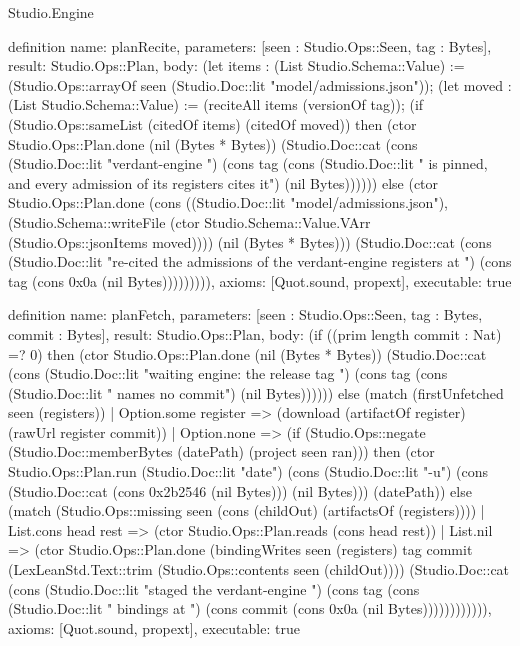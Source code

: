 \begin{lexlean}{Studio.Engine}
\begin{semanticmodule}
definition{
  name: planRecite,
  parameters: [seen : Studio.Ops::Seen, tag : Bytes],
  result: Studio.Ops::Plan,
  body: (let items : (List Studio.Schema::Value) := (Studio.Ops::arrayOf seen (Studio.Doc::lit "model/admissions.json")); (let moved : (List Studio.Schema::Value) := (reciteAll items (versionOf tag)); (if (Studio.Ops::sameList (citedOf items) (citedOf moved)) then (ctor Studio.Ops::Plan.done (nil (Bytes * Bytes)) (Studio.Doc::cat (cons (Studio.Doc::lit "verdant-engine ") (cons tag (cons (Studio.Doc::lit " is pinned, and every admission of its registers cites it\n") (nil Bytes)))))) else (ctor Studio.Ops::Plan.done (cons ((Studio.Doc::lit "model/admissions.json"), (Studio.Schema::writeFile (ctor Studio.Schema::Value.VArr (Studio.Ops::jsonItems moved)))) (nil (Bytes * Bytes))) (Studio.Doc::cat (cons (Studio.Doc::lit "re-cited the admissions of the verdant-engine registers at ") (cons tag (cons 0x0a (nil Bytes))))))))),
  axioms: [Quot.sound, propext],
  executable: true
}

definition{
  name: planFetch,
  parameters: [seen : Studio.Ops::Seen, tag : Bytes, commit : Bytes],
  result: Studio.Ops::Plan,
  body: (if ((prim length commit : Nat) =? 0) then (ctor Studio.Ops::Plan.done (nil (Bytes * Bytes)) (Studio.Doc::cat (cons (Studio.Doc::lit "waiting engine: the release tag ") (cons tag (cons (Studio.Doc::lit " names no commit\n") (nil Bytes)))))) else (match (firstUnfetched seen (registers))
    | Option.some register => (download (artifactOf register) (rawUrl register commit))
    | Option.none => (if (Studio.Ops::negate (Studio.Doc::memberBytes (datePath) (project seen ran))) then (ctor Studio.Ops::Plan.run (Studio.Doc::lit "date") (cons (Studio.Doc::lit "-u") (cons (Studio.Doc::cat (cons 0x2b2546 (nil Bytes))) (nil Bytes))) (datePath)) else (match (Studio.Ops::missing seen (cons (childOut) (artifactsOf (registers))))
      | List.cons head rest => (ctor Studio.Ops::Plan.reads (cons head rest))
      | List.nil => (ctor Studio.Ops::Plan.done (bindingWrites seen (registers) tag commit (LexLeanStd.Text::trim (Studio.Ops::contents seen (childOut)))) (Studio.Doc::cat (cons (Studio.Doc::lit "staged the verdant-engine ") (cons tag (cons (Studio.Doc::lit " bindings at ") (cons commit (cons 0x0a (nil Bytes)))))))))))),
  axioms: [Quot.sound, propext],
  executable: true
}


\end{semanticmodule}
\end{lexlean}
